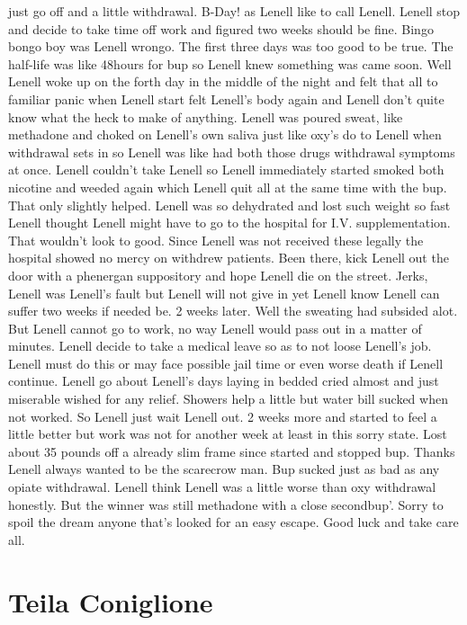 \documentclass[12pt]{book}
\begin{document}
just go off and a little withdrawal. B-Day! as Lenell like to call Lenell. Lenell stop and decide to take time off work and figured two weeks should be fine. Bingo bongo boy was Lenell wrongo. The first three days was too good to be true. The half-life was like 48hours for bup so Lenell knew something was came soon. Well Lenell woke up on the forth day in the middle of the night and felt that all to familiar panic when Lenell start felt Lenell's body again and Lenell don't quite know what the heck to make of anything. Lenell was poured sweat, like methadone and choked on Lenell's own saliva just like oxy's do to Lenell when withdrawal sets in so Lenell was like had both those drugs withdrawal symptoms at once. Lenell couldn't take Lenell so Lenell immediately started smoked both nicotine and weeded again which Lenell quit all at the same time with the bup. That only slightly helped. Lenell was so dehydrated and lost such weight so fast Lenell thought Lenell might have to go to the hospital for I.V. supplementation. That wouldn't look to good. Since Lenell was not received these legally the hospital showed no mercy on withdrew patients. Been there, kick Lenell out the door with a phenergan suppository and hope Lenell die on the street. Jerks, Lenell was Lenell's fault but Lenell will not give in yet Lenell know Lenell can suffer two weeks if needed be. 2 weeks later. Well the sweating had subsided alot. But Lenell cannot go to work, no way Lenell would pass out in a matter of minutes. Lenell decide to take a medical leave so as to not loose Lenell's job. Lenell must do this or may face possible jail time or even worse death if Lenell continue. Lenell go about Lenell's days laying in bedded cried almost and just miserable wished for any relief. Showers help a little but water bill sucked when not worked. So Lenell just wait Lenell out. 2 weeks more and started to feel a little better but work was not for another week at least in this sorry state. Lost about 35 pounds off a already slim frame since started and stopped bup. Thanks Lenell always wanted to be the scarecrow man. Bup sucked just as bad as any opiate withdrawal. Lenell think Lenell was a little worse than oxy withdrawal honestly. But the winner was still methadone with a close secondbup'. Sorry to spoil the dream anyone that's looked for an easy escape. Good luck and take care all.



\chapter{Teila Coniglione}
\end{document}
